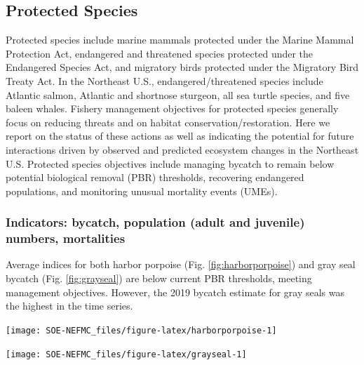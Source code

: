 \documentclass[
  10pt,
]{article}
\let\origfigure\figure
\let\endorigfigure\endfigure
\renewenvironment{figure}[1][2] {
    \expandafter\origfigure\expandafter[H]
} {
    \endorigfigure
}
\begin{document}
\hypertarget{protected-species}{%
\subsection{Protected Species}\label{protected-species}}

Protected species include marine mammals protected under the Marine Mammal Protection Act, endangered and threatened species protected under the Endangered Species Act, and migratory birds protected under the Migratory Bird Treaty Act. In the Northeast U.S., endangered/threatened species include Atlantic salmon, Atlantic and shortnose sturgeon, all sea turtle species, and five baleen whales. Fishery management objectives for protected species generally focus on reducing threats and on habitat conservation/restoration. Here we report on the status of these actions as well as indicating the potential for future interactions driven by observed and predicted ecosystem changes in the Northeast U.S. Protected species objectives include managing bycatch to remain below potential biological removal (PBR) thresholds, recovering endangered populations, and monitoring unusual mortality events (UMEs).

\hypertarget{indicators-bycatch-population-adult-and-juvenile-numbers-mortalities}{%
\subsubsection{Indicators: bycatch, population (adult and juvenile) numbers, mortalities}\label{indicators-bycatch-population-adult-and-juvenile-numbers-mortalities}}

Average indices for both harbor porpoise (Fig. \ref{fig:harborporpoise}) and gray seal bycatch (Fig. \ref{fig:grayseal}) are below current PBR thresholds, meeting management objectives. However, the 2019 bycatch estimate for gray seals was the highest in the time series.

\begin{figure}

{\centering \texttt{[image: SOE-NEFMC\_files/figure-latex/harborporpoise-1]} 

}

\caption{Harbor porpoise average bycatch estimate for Mid-Atlantic and New England gillnet fisheries (blue) and the potential biological removal (red).}\label{fig:harborporpoise}
\end{figure}

\begin{figure}

{\centering \texttt{[image: SOE-NEFMC\_files/figure-latex/grayseal-1]} 

}

\caption{Gray Seal average bycatch estimate for gillnet fisheries (blue) and and the potential biological removal (red).}\label{fig:grayseal}
\end{figure}
\end{document}
